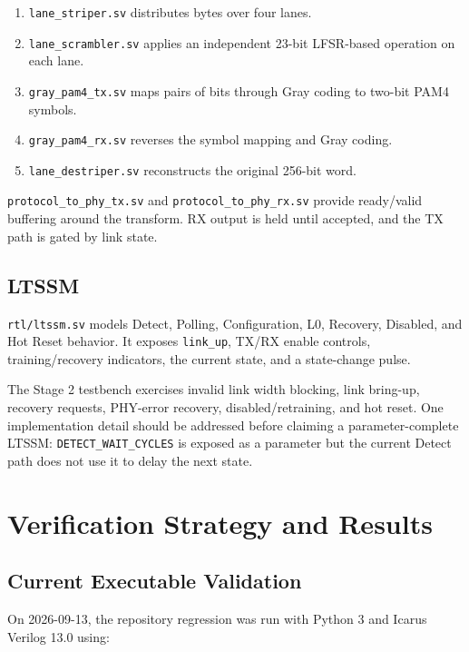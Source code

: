\documentclass[11pt,a4paper]{article}
\newcommand{\code}[1]{\texttt{#1}}
\begin{document}
\begin{enumerate}[leftmargin=*]
    \item \code{lane\_striper.sv} distributes bytes over four lanes.
    \item \code{lane\_scrambler.sv} applies an independent 23-bit LFSR-based operation on each lane.
    \item \code{gray\_pam4\_tx.sv} maps pairs of bits through Gray coding to two-bit PAM4 symbols.
    \item \code{gray\_pam4\_rx.sv} reverses the symbol mapping and Gray coding.
    \item \code{lane\_destriper.sv} reconstructs the original 256-bit word.
\end{enumerate}

\code{protocol\_to\_phy\_tx.sv} and \code{protocol\_to\_phy\_rx.sv} provide ready/valid
buffering around the transform. RX output is held until accepted, and the TX path is gated
by link state.

\subsection{LTSSM}
\code{rtl/ltssm.sv} models Detect, Polling, Configuration, L0, Recovery, Disabled, and Hot
Reset behavior. It exposes \code{link\_up}, TX/RX enable controls, training/recovery
indicators, the current state, and a state-change pulse.

The Stage 2 testbench exercises invalid link width blocking, link bring-up, recovery
requests, PHY-error recovery, disabled/retraining, and hot reset. One implementation detail
should be addressed before claiming a parameter-complete LTSSM:
\code{DETECT\_WAIT\_CYCLES} is exposed as a parameter but the current Detect path does not
use it to delay the next state.

\section{Verification Strategy and Results}

\subsection{Current Executable Validation}
On 2026-09-13, the repository regression was run with Python 3 and Icarus Verilog 13.0
using:
\end{document}
